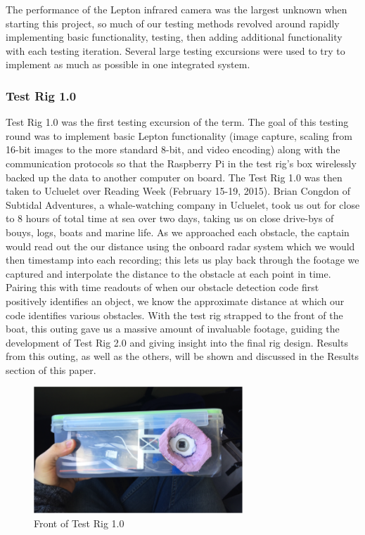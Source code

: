 The performance of the Lepton infrared camera was the largest unknown when starting this project, so much of our testing methods revolved around rapidly implementing basic functionality, testing, then adding additional functionality with each testing iteration. Several large testing excursions were used to try to implement as much as possible in one integrated system.


\subsubsection{\label{sec:discussion:testing:testrig1}Test Rig 1.0}

Test Rig 1.0 was the first testing excursion of the term. The goal of this testing round was to implement basic Lepton functionality (image capture, scaling from 16-bit images to the more standard 8-bit, and video encoding) along with the communication protocols so that the Raspberry Pi in the test rig's box wirelessly backed up the data to another computer on board. The Test Rig 1.0 was then taken to Ucluelet over Reading Week (February 15-19, 2015). Brian Congdon of Subtidal Adventures, a whale-watching company in Ucluelet, took us out for close to 8 hours of total time at sea over two days, taking us on close drive-bys of bouys, logs, boats and marine life. As we approached each obstacle, the captain would read out the our distance using the onboard radar system which we would then timestamp into each recording; this lets us play back through the footage we captured and interpolate the distance to the obstacle at each point in time. Pairing this with time readouts of when our obstacle detection code first positively identifies an object, we know the approximate distance at which our code identifies various obstacles. With the test rig strapped to the front of the boat, this outing gave us a massive amount of invaluable footage, guiding the development of Test Rig 2.0 and giving insight into the final rig design. Results from this outing, as well as the others, will be shown and discussed in the Results section of this paper.

\begin{figure}
\centering
\includegraphics[width=0.7\textwidth]{"./image/testrig1_front"}
\caption{Front of Test Rig 1.0}
\label{fig:testrig1_testing}
\end{figure}


